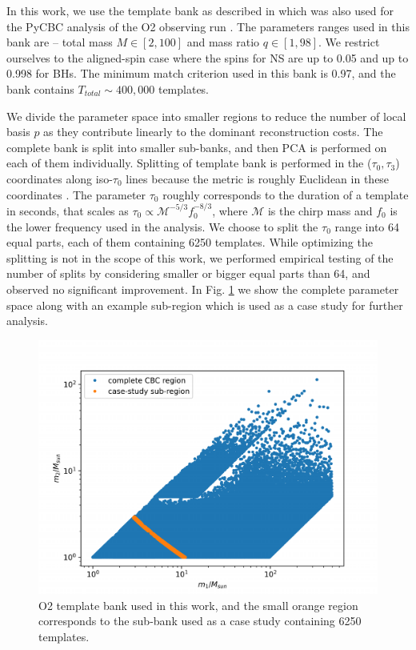 In this work, we use the template bank as described in \cite{TB_used} which was also used for the PyCBC analysis of the O2 observing run \cite{2ogc}. The parameters ranges used in this bank are -- total mass $M \in [2, 100]$ and mass ratio $q \in [1, 98]$. We restrict ourselves to the aligned-spin case where the spins for NS are up to 0.05 and up to 0.998 for BHs. The minimum match criterion used in this bank is 0.97, and the bank contains $T_{total} \sim 400,000$ templates.

We divide the parameter space into smaller regions to reduce the number of local basis $p$ as they contribute linearly to the dominant reconstruction costs. The complete bank is split into smaller sub-banks, and then PCA is performed on each of them individually. Splitting of template bank is performed in the ($\tau_0, \tau_3$) coordinates along iso-$\tau_0$ lines because the metric is roughly Euclidean in these coordinates \cite{tau0_tau3}. The parameter $\tau_0$ roughly corresponds to the duration of a template in seconds, that scales as $\tau_0 \propto \mathcal{M}^{-5/3} f_{0}^{-8/3}$, where $\mathcal{M}$ is the chirp mass and $f_{0}$ is the lower frequency used in the analysis. We choose to split the $\tau_0$ range into 64 equal parts, each of them containing 6250 templates. While optimizing the splitting is not in the scope of this work, we performed empirical testing of the number of splits by considering smaller or bigger equal parts than 64, and observed no significant improvement. In Fig. \ref{Bank} we show the complete parameter space along with an example sub-region which is used as a case study for further analysis.

\begin{figure}
    \centering
    \includegraphics[width=\linewidth]{figures/Hierarchical_MF/CBC_aligned.pdf}
    \caption{O2 template bank \cite{TB_used} used in this work, and the small orange region corresponds to the sub-bank used as a case study  containing 6250 templates.}
    \label{Bank}
\end{figure}

